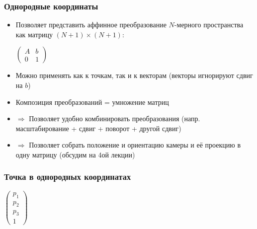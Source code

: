 \documentclass[10pt]{beamer}
\begin{document}
\begin{frame}[fragile]
\frametitle{Однородные координаты}
\begin{itemize}
\item Позволяет представить аффинное преобразование \begin{math}N\end{math}-мерного пространства как матрицу \begin{math}(N+1)\times (N+1)\end{math}:

\begin{center}
\begin{math}
\begin{pmatrix}
A & b \\
0 & 1
\end{pmatrix}
\end{math}
\end{center}
\pause
\item Можно применять как к точкам, так и к векторам (векторы игнорируют сдвиг на \begin{math}b\end{math})
\pause
\item Композиция преобразований = умножение матриц
\pause
\item \begin{math}\Rightarrow\end{math} Позволяет удобно комбинировать преобразования (напр. масштабирование + сдвиг + поворот + другой сдвиг)
\pause
\item \begin{math}\Rightarrow\end{math} Позволяет собрать положение и ориентацию камеры и её проекцию в одну матрицу (обсудим на 4ой лекции)
\end{itemize}
\end{frame}

\begin{frame}[fragile]
\frametitle{Точка в однородных координатах}
\begin{center}
\begin{math}
\begin{pmatrix}
p_1 \\
p_2 \\
p_3 \\
1
\end{pmatrix}
\end{math}
\end{center}
\end{frame}
\end{document}
